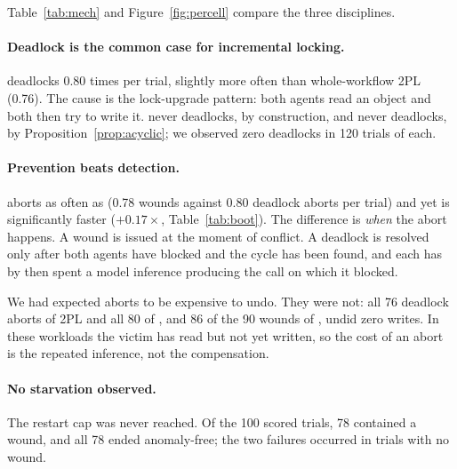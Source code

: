 Table~\ref{tab:mech} and Figure~\ref{fig:percell} compare the three
disciplines.

\paragraph{Deadlock is the common case for incremental locking.}
\cctwo deadlocks 0.80 times per trial, slightly more often than
whole-workflow 2PL (0.76). The cause is the lock-upgrade pattern: both agents
read an object and both then try to write it. \cc never deadlocks, by
construction, and \ccs never deadlocks, by Proposition~\ref{prop:acyclic}; we
observed zero deadlocks in 120 trials of each.

\paragraph{Prevention beats detection.}
\ccs aborts as often as \cctwo (0.78 wounds against 0.80 deadlock aborts per
trial) and yet is significantly faster ($+0.17\times$,
Table~\ref{tab:boot}). The difference is \emph{when} the abort happens. A
wound is issued at the moment of conflict. A deadlock is resolved only after
both agents have blocked and the cycle has been found, and each has by then
spent a model inference producing the call on which it blocked.

We had expected aborts to be expensive to undo. They were not: all 76 deadlock
aborts of 2PL and all 80 of \cctwo, and 86 of the 90 wounds of \ccs, undid
zero writes. In these workloads the victim has read but not yet written, so
the cost of an abort is the repeated inference, not the compensation.

\paragraph{No starvation observed.}
The restart cap was never reached. Of the 100 scored \ccs trials, 78 contained
a wound, and all 78 ended anomaly-free; the two \ccs failures occurred in
trials with no wound.

